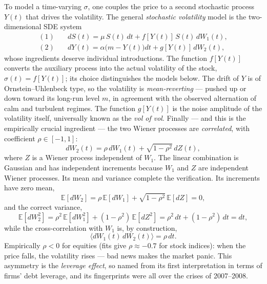 To model a time-varying $\sigma$, one couples the price to a second stochastic process $Y(t)$ that drives the volatility.
The general \emph{stochastic volatility} model is the two-dimensional SDE system
\begin{align}
(1)\quad & dS(t) = \mu\, S(t)\, dt + f[Y(t)]\, S(t)\, dW_1(t), \label{eq:sv-stock} \\[4pt]
(2)\quad & dY(t) = \alpha\bigl(m - Y(t)\bigr)dt + g[Y(t)]\, dW_2(t), \label{eq:sv-vol}
\end{align}
whose ingredients deserve individual introductions.
The function $f[Y(t)]$ converts the auxiliary process into the actual volatility of the stock, $\sigma(t)=f[Y(t)]$; its choice distinguishes the models below.
The drift of $Y$ is of Ornstein--Uhlenbeck type, so the volatility is \emph{mean-reverting} --- pushed up or down toward its long-run level $m$, in agreement with the observed alternation of calm and turbulent regimes.
The function $g[Y(t)]$ is the noise amplitude of the volatility itself, universally known as the \emph{vol of vol}.
Finally --- and this is the empirically crucial ingredient --- the two Wiener processes are \emph{correlated}, with coefficient $\rho \in [-1,1]$:
\begin{equation}
dW_2(t) = \rho\, dW_1(t) + \sqrt{1-\rho^2}\, dZ(t),
\end{equation}
where $Z$ is a Wiener process independent of $W_1$.
The linear combination is Gaussian and has independent increments because $W_1$ and $Z$ are independent Wiener processes.
Its mean and variance complete the verification.
Its increments have zero mean,
\begin{equation}
\mathbb{E}[dW_2] = \rho\,\mathbb{E}[dW_1] + \sqrt{1-\rho^2}\,\mathbb{E}[dZ] = 0,
\end{equation}
and the correct variance,
\begin{equation}
\mathbb{E}[dW_2^2] = \rho^2\,\mathbb{E}[dW_1^2] + (1-\rho^2)\,\mathbb{E}[dZ^2] = \rho^2\,dt + (1-\rho^2)\,dt = dt,
\end{equation}
while the cross-correlation with $W_1$ is, by construction,
\begin{equation}
\langle dW_1(t)\, dW_2(t)\rangle = \rho\, dt.
\end{equation}
Empirically $\rho<0$ for equities (fits give $\rho\approx-0.7$ for stock indices): when the price falls, the volatility rises --- bad news makes the market panic.
This asymmetry is the \emph{leverage effect}, so named from its first interpretation in terms of firms' debt leverage, and its fingerprints were all over the crises of 2007--2008.


